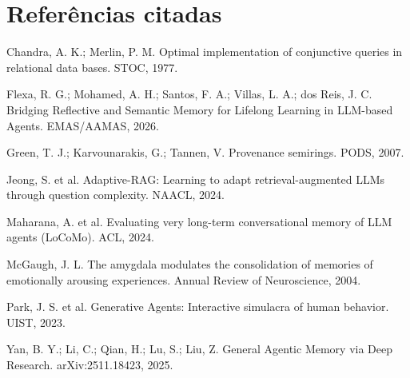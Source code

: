 \documentclass[11pt]{article}
\begin{document}
\section*{Referências citadas}
\small
\begin{description}[nosep, leftmargin=1em, font=\normalfont]
\item Chandra, A. K.; Merlin, P. M. Optimal implementation of conjunctive queries in relational data bases. STOC, 1977.
\item Flexa, R. G.; Mohamed, A. H.; Santos, F. A.; Villas, L. A.; dos Reis, J. C. Bridging Reflective and Semantic Memory for Lifelong Learning in LLM-based Agents. EMAS/AAMAS, 2026.
\item Green, T. J.; Karvounarakis, G.; Tannen, V. Provenance semirings. PODS, 2007.
\item Jeong, S. et al. Adaptive-RAG: Learning to adapt retrieval-augmented LLMs through question complexity. NAACL, 2024.
\item Maharana, A. et al. Evaluating very long-term conversational memory of LLM agents (LoCoMo). ACL, 2024.
\item McGaugh, J. L. The amygdala modulates the consolidation of memories of emotionally arousing experiences. Annual Review of Neuroscience, 2004.
\item Park, J. S. et al. Generative Agents: Interactive simulacra of human behavior. UIST, 2023.
\item Yan, B. Y.; Li, C.; Qian, H.; Lu, S.; Liu, Z. General Agentic Memory via Deep Research. arXiv:2511.18423, 2025.
\end{description}
\end{document}
